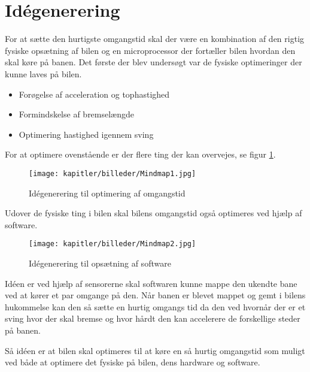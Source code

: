 
\newpage
\section{Idégenerering}
For at sætte den hurtigste omgangstid skal der være en kombination af den rigtig fysiske opsætning af bilen og en microprocessor der fortæller bilen hvordan den skal køre på banen. Det første der blev undersøgt var de fysiske optimeringer der kunne laves på bilen.
\begin{itemize}
\item Forøgelse af acceleration og tophastighed
\item Formindskelse af bremselængde
\item Optimering hastighed igennem sving
\end{itemize}
For at optimere ovenstående er der flere ting der kan overvejes, se figur \ref{fig:mindmap1}.

\begin{figure}[ht]
    \centering
    \texttt{[image: kapitler/billeder/Mindmap1.jpg]}
    \caption{Idégenerering til optimering af omgangstid}
    \label{fig:mindmap1}
\end{figure}

Udover de fysiske ting i bilen skal bilens omgangstid også optimeres ved hjælp af software.


\newpage

\begin{figure}[ht]
    \centering
    \texttt{[image: kapitler/billeder/Mindmap2.jpg]}
    \caption{Idégenerering til opsætning af software}
    \label{fig:mindmap2}
\end{figure}


Idéen er ved hjælp af sensorerne skal softwaren kunne mappe den ukendte bane ved at kører et par omgange på den. Når banen er blevet mappet og gemt i bilens hukommelse kan den så sætte en hurtig omgangs tid da den ved hvornår der er et sving hvor der skal bremse og hvor hårdt den kan accelerere de forskellige steder på banen.

Så idéen er at bilen skal optimeres til at køre en så hurtig omgangstid som muligt ved både at optimere det fysiske på bilen, dens hardware og software.

